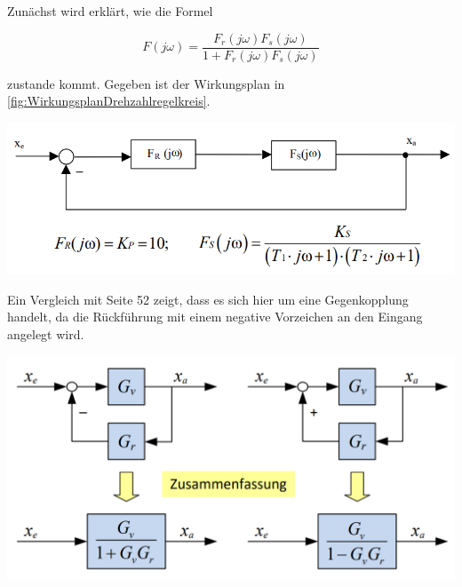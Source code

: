 \documentclass[            %
draft = false,             		%
paper = A4,                		%
pagesize = pdftex,         		%
fontsize = 10pt,           		%
DIV=15,                    		%
twoside = false,           		%
twocolumn = false,         		%
parskip = full,           		%
chapterprefix = false,      		%
appendixprefix = true,     		%
headinclude = false,       		%
footinclude = false,       		%
mpinclude = false,         		%
numbers = auto,            		%
cleardoublepage = plain,   		%
footnotes = multiple,      		%
titlepage = true,          		%
headings = normal,         		%
open = right,              		%
bibliography = openstyle,  		%
listof = chaptergapline,   		%
overfullrule = true,
]{scrbook}
\begin{document}
Zunächst wird erklärt, wie die Formel

\begin{equation}
F(j\omega) = \frac{F_r(j\omega)F_s(j\omega)}{1 + F_r(j\omega)F_s(j\omega)}
\end{equation}

zustande kommt. Gegeben ist der Wirkungsplan in \ref{fig:WirkungsplanDrehzahlregelkreis}.

\begin{center}
   \begin{minipage}[b]{0.6\textwidth}
      \includegraphics[scale=0.7]{Bilder/WirkungsplanDrehzahlregelkreis.PNG}
      \label{fig:WirkungsplanDrehzahlregelkreis} 
   \end{minipage}
\end{center}

Ein Vergleich mit \cite{Skript_Regelungstechnik} Seite 52 zeigt, dass es sich hier um eine Gegenkopplung handelt, da die Rückführung mit einem negative Vorzeichen an 
den Eingang angelegt wird. 

\begin{center}
   \begin{minipage}[b]{0.9\textwidth}
      \includegraphics[scale=0.7]{Bilder/GegenUndMitkopplung.PNG}
      \label{fig:GegenUndMitkopplung} 
   \end{minipage}
\end{center}
\end{document}
